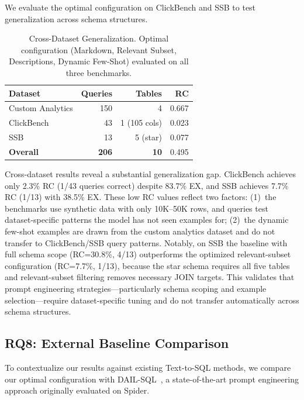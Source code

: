 \documentclass[sigconf, nonacm]{acmart}
\begin{document}
We evaluate the optimal configuration on ClickBench and SSB to test generalization across schema structures.

\begin{table}[t]
\caption{Cross-Dataset Generalization. Optimal configuration (Markdown, Relevant Subset, Descriptions, Dynamic Few-Shot) evaluated on all three benchmarks.}
\label{tab:crossdataset}
\centering
\small
\begin{tabular}{lrrr}
\toprule
\textbf{Dataset} & \textbf{Queries} & \textbf{Tables} & \textbf{RC} \\
\midrule
Custom Analytics & 150 & 4 & 0.667 \\
ClickBench & 43 & 1 (105 cols) & 0.023 \\
SSB & 13 & 5 (star) & 0.077 \\
\midrule
\textbf{Overall} & \textbf{206} & \textbf{10} & 0.495 \\
\bottomrule
\end{tabular}
\end{table}

Cross-dataset results reveal a substantial generalization gap. ClickBench achieves only 2.3\% RC (1/43 queries correct) despite 83.7\% EX, and SSB achieves 7.7\% RC (1/13) with 38.5\% EX. These low RC values reflect two factors: (1)~the benchmarks use synthetic data with only 10K--50K rows, and queries test dataset-specific patterns the model has not seen examples for; (2)~the dynamic few-shot examples are drawn from the custom analytics dataset and do not transfer to ClickBench/SSB query patterns. Notably, on SSB the baseline with full schema scope (RC=30.8\%, 4/13) outperforms the optimized relevant-subset configuration (RC=7.7\%, 1/13), because the star schema requires all five tables and relevant-subset filtering removes necessary JOIN targets. This validates that prompt engineering strategies---particularly schema scoping and example selection---require dataset-specific tuning and do not transfer automatically across schema structures.

\subsection{RQ8: External Baseline Comparison}
\label{sec:baseline}

To contextualize our results against existing Text-to-SQL methods, we compare our optimal configuration with DAIL-SQL~\cite{gao2024dailsql}, a state-of-the-art prompt engineering approach originally evaluated on Spider.
\end{document}
